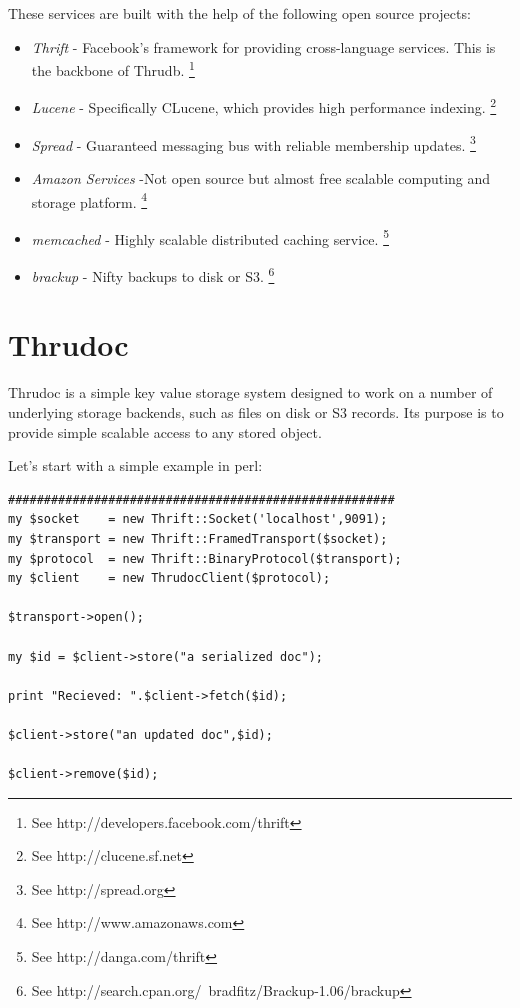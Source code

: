 \documentclass[nocopyrightspace,blockstyle]{sigplanconf}
\begin{document}
These services are built with the help of the following open source projects:
\begin{itemize}
\item\textit{Thrift}    - Facebook's framework for providing cross-language services.  This is the backbone of Thrudb. \footnote{See http://developers.facebook.com/thrift}

\item\textit{Lucene}    - Specifically CLucene, which provides high performance indexing. \footnote{See http://clucene.sf.net}

\item\textit{Spread}    - Guaranteed messaging bus with reliable membership updates. \footnote{See http://spread.org}

\item\textit{Amazon Services} -Not open source but almost free scalable computing and storage platform. \footnote{See http://www.amazonaws.com}

\item\textit{memcached} - Highly scalable distributed caching service. \footnote{See http://danga.com/thrift}

\item\textit{brackup}   - Nifty backups to disk or S3. \footnote{See http://search.cpan.org/~bradfitz/Brackup-1.06/brackup}
\end{itemize}

\section{Thrudoc}

Thrudoc is a simple key value storage system designed to work on a number of underlying storage backends, such as files on disk or S3 records.
Its purpose is to provide simple scalable access to any stored object.

Let's start with a simple example in perl:

\begin{verbatim}
######################################################
my $socket    = new Thrift::Socket('localhost',9091);
my $transport = new Thrift::FramedTransport($socket);
my $protocol  = new Thrift::BinaryProtocol($transport);
my $client    = new ThrudocClient($protocol);

$transport->open();

my $id = $client->store("a serialized doc");

print "Recieved: ".$client->fetch($id);

$client->store("an updated doc",$id);

$client->remove($id);

\end{verbatim}
\end{document}
